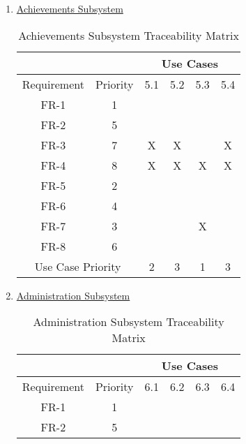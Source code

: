 \documentclass{article}
\begin{document}
\begin{enumerate}
	\item \underline{Achievements Subsystem}
	\begin{table}[]
\centering
\caption{Achievements Subsystem Traceability Matrix}
\label{my-label}
\begin{tabular}{cc|c|c|c|c|}
\cline{3-6}
                                  &          & \multicolumn{4}{c|}{Use Cases} \\ \hline
\multicolumn{1}{|c|}{Requirement} & Priority & 5.1    & 5.2   & 5.3   & 5.4   \\ \hline
\multicolumn{1}{|c|}{FR-1}        & 1        &        &       &       &       \\ \hline
\multicolumn{1}{|c|}{FR-2}        & 5        &        &       &       &       \\ \hline
\multicolumn{1}{|c|}{FR-3}        & 7        & X      & X     &       & X     \\ \hline
\multicolumn{1}{|c|}{FR-4}        & 8        & X      & X     & X     & X     \\ \hline
\multicolumn{1}{|c|}{FR-5}        & 2        &        &       &       &       \\ \hline
\multicolumn{1}{|c|}{FR-6}        & 4        &        &       &       &       \\ \hline
\multicolumn{1}{|c|}{FR-7}        & 3        &        &       & X     &       \\ \hline
\multicolumn{1}{|c|}{FR-8}        & 6        &        &       &       &       \\ \hline
\multicolumn{2}{|c|}{Use Case Priority}      & 2      & 3     & 1     & 3     \\ \hline
\end{tabular}
\end{table}
	\item \underline{Administration Subsystem}
		\begin{table}[]
\centering
\caption{Administration Subsystem Traceability Matrix}
\label{my-label}
\begin{tabular}{cc|c|c|c|c|}
\cline{3-6}
                                  &          & \multicolumn{4}{c|}{Use Cases} \\ \hline
\multicolumn{1}{|c|}{Requirement} & Priority & 6.1    & 6.2   & 6.3   & 6.4   \\ \hline
\multicolumn{1}{|c|}{FR-1}        & 1        &        &       &       &       \\ \hline
\multicolumn{1}{|c|}{FR-2}        & 5        &        &       &       &       \\ \hline

\end{tabular}
\end{table}
\end{enumerate}
\end{document}
